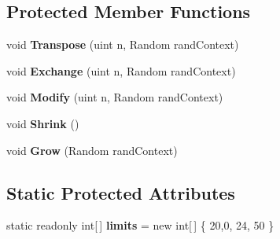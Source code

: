 \subsection*{Protected Member Functions}
\begin{DoxyCompactItemize}
\item 
\hypertarget{class_music_population_1_1_member1_ae7d3efd24060a4c5d1a52368fa7aec79}{void {\bfseries Transpose} (uint n, Random rand\+Context)}\label{class_music_population_1_1_member1_ae7d3efd24060a4c5d1a52368fa7aec79}

\item 
\hypertarget{class_music_population_1_1_member1_a720b21ed0d2966e05aaa1c7b880d7c65}{void {\bfseries Exchange} (uint n, Random rand\+Context)}\label{class_music_population_1_1_member1_a720b21ed0d2966e05aaa1c7b880d7c65}

\item 
\hypertarget{class_music_population_1_1_member1_a1adf3286eab4efb6fbed397855cb4078}{void {\bfseries Modify} (uint n, Random rand\+Context)}\label{class_music_population_1_1_member1_a1adf3286eab4efb6fbed397855cb4078}

\item 
\hypertarget{class_music_population_1_1_member1_a769d65c91a63868d22b791cf548e6d69}{void {\bfseries Shrink} ()}\label{class_music_population_1_1_member1_a769d65c91a63868d22b791cf548e6d69}

\item 
\hypertarget{class_music_population_1_1_member1_af65bc0bf3e52457f8cb9acecd5ef45e8}{void {\bfseries Grow} (Random rand\+Context)}\label{class_music_population_1_1_member1_af65bc0bf3e52457f8cb9acecd5ef45e8}

\end{DoxyCompactItemize}
\subsection*{Static Protected Attributes}
\begin{DoxyCompactItemize}
\item 
\hypertarget{class_music_population_1_1_member1_a990892a889f12181ac818256c2f27204}{static readonly int\mbox{[}$\,$\mbox{]} {\bfseries limits} = new int\mbox{[}$\,$\mbox{]} \{ 20,0, 24, 50 \}}\label{class_music_population_1_1_member1_a990892a889f12181ac818256c2f27204}

\end{DoxyCompactItemize}
